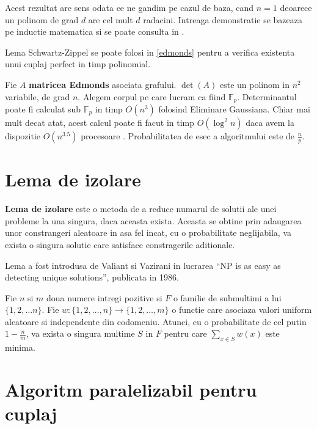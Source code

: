Acest rezultat are sens odata ce ne gandim pe cazul de baza, cand $n=1$ deoarece
un polinom de grad $d$ are cel mult $d$ radacini. Intreaga demonstratie se
bazeaza pe inductie matematica si se poate consulta in \cite{schwartzzippel}.

\begin{thm}
  Lema Schwartz-Zippel se poate folosi in \ref{edmonds} pentru a verifica
  existenta unui cuplaj perfect in timp polinomial.
\end{thm}

Fie $A$ \textbf{matricea Edmonds} asociata grafului. $\det(A)$ este un polinom
in $n^{2}$ variabile, de grad $n$. Alegem corpul pe care lucram ca fiind
$\mathbb{F}_{p}$. Determinantul poate fi calculat sub $\mathbb{F}_{p}$ in timp $O(n^{3})$
folosind Eliminare Gaussiana. Chiar mai mult decat atat, acest calcul
poate fi facut in timp $O(\log^{2} n)$ daca avem la dispozitie $O(n^{3.5})$
procesoare \cite{paralleldet}. Probabilitatea de esec a algoritmului este de $\frac{n}{p}$.

\pagebreak

\section{Lema de izolare}
\textbf{Lema de izolare} este o metoda de a reduce numarul de solutii ale unei
probleme la una singura, daca aceasta exista. Aceasta se obtine prin adaugarea
unor constrangeri aleatoare in asa fel incat, cu o probabilitate neglijabila,
va exista o singura solutie care satisface constragerile aditionale.

Lema a fost introdusa de Valiant si Vazirani in lucrarea ``NP is as easy as
detecting unique solutions'', publicata in 1986.

\begin{thm}
  \label{isolation}
  Fie $n$ si $m$ doua numere intregi pozitive si $F$ o familie de submultimi a
  lui $\{1, 2, \ldots n\}$. Fie
  $w : \{1, 2, \ldots, n\} \to \{1, 2, \ldots, m\}$ o functie care asociaza
  valori uniform aleatoare si independente din codomeniu. Atunci, cu o
  probabilitate de cel putin $1 - \frac{n}{m}$, va exista o singura multime $S$ in
  $F$ pentru care $\displaystyle\sum\limits_{x\in S}{w(x)}$ este minima.
\end{thm}

\pagebreak

\section{Algoritm paralelizabil pentru cuplaj}
\label{Algoritm paralelizabil pentru cuplaj}

